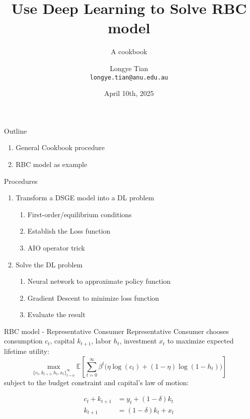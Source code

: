 \documentclass[aspectratio=169]{beamer} %
\title[DL]{Use Deep Learning to Solve RBC model}
\subtitle{A cookbook}
\author[Longye]{Longye Tian \\ \texttt{longye.tian@anu.edu.au}}
\institute[ANU]{Australian National University\\ School of Economics}
\date{April 10th, 2025}
\begin{document}
\begin{frame}
  \titlepage
\end{frame}

\begin{frame}{Outline}
  \begin{enumerate}
      \item General Cookbook procedure
      \item RBC model as example
  \end{enumerate}
\end{frame}

\begin{frame}{Procedures}
\begin{enumerate}
    \item Transform a DSGE model into a DL problem
    \begin{enumerate}
        \item First-order/equilibrium conditions
        \item Establish the Loss function
        \item AIO operator trick
    \end{enumerate}
    \item Solve the DL problem
    \begin{enumerate}
        \item Neural network to approximate policy function
        \item Gradient Descent to minimize loss function
        \item Evaluate the result
    \end{enumerate}
\end{enumerate}
    
\end{frame}


\begin{frame}{RBC model - Representative Consumer}
Representative Consumer chooses consumption $c_t$, capital $k_{t+1}$, labor $h_t$, investment $x_t$ to maximize expected lifetime utility:
$$ \max_{\{c_t, k_{t+1}, h_t,x_t\}_{t=0}^{\infty}} \mathbb{E}\left[ \sum_{t=0}^\infty\beta^t \Big(\eta \log(c_t) + (1-\eta)\log(1 - h_t) \Big) \right]$$
subject to the budget constraint and capital's law of motion:

\begin{align*}
    c_t + k_{t+1} &= y_t + (1 - \delta)k_{t}\tag{1}\\
    k_{t+1} &= (1-\delta)k_t + x_t\tag{2}
\end{align*}
   
    
\end{frame}
\end{document}
